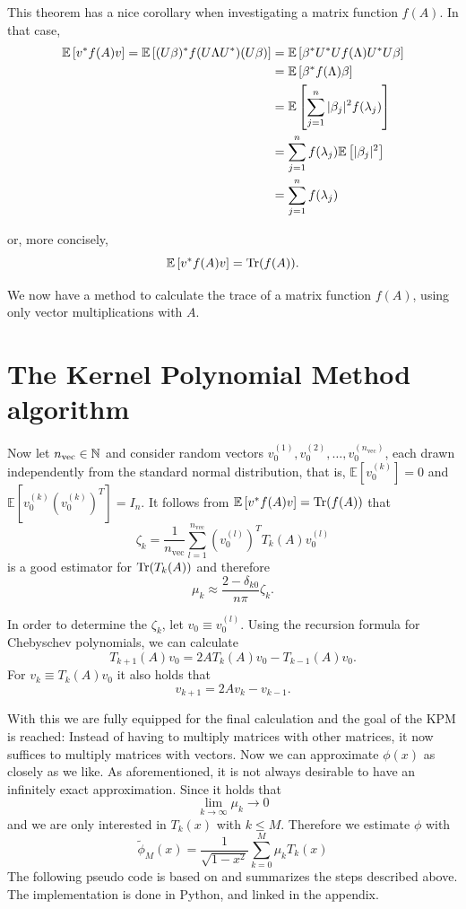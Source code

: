 This theorem has a nice corollary when investigating a matrix function $f(A)$.
In that case,
\begin{align*}
    \mathbb{E}\left[v^* f(A) v\right] = \mathbb{E}\left[(U\beta)^* f(U\Lambda U^*) (U\beta)\right] &= \mathbb{E}\left[\beta^* U^* U f(\Lambda) U^* U \beta\right] \\
    &= \mathbb{E}\left[\beta^* f(\Lambda) \beta\right] \\
    &= \mathbb{E}\left[\sum_{j = 1}^n |\beta_j|^2 f(\lambda_j) \right] \\
    &= \sum_{j = 1}^n f(\lambda_j) \mathbb{E}\left[ |\beta_j|^2 \right] \\
    &= \sum_{j = 1}^n f(\lambda_j)
\end{align*}

or, more concisely,
\[
    \mathbb{E}\left[v^* f(A) v\right] = \operatorname{Tr}(f(A)).
\]

We now have a method to calculate the trace of a matrix function $f(A)$,
using only vector multiplications with $A$.

\section{The Kernel Polynomial Method algorithm}

Now let $n_{\text{vec}} \in \mathbb{N}$ and consider random vectors $v_0^{(1)}, v_0^{(2)}, \dots, v_0^{(n_{\text{vec}})}$,
each drawn independently from the standard normal distribution, that is, $\mathbb{E}[v_0^{(k)}] = 0$ and $\mathbb{E}\left[v_0^{(k)} \left(v_0^{(k)}\right)^T\right] = I_n$.
It follows from $\mathbb{E}\left[v^* f(A) v\right] = \operatorname{Tr}(f(A))$ that
\[
\zeta_k = \frac{1}{n_{\text{vec}}} \sum_{l = 1}^{n_{\text{vec}}} \left( v_0^{(l)} \right)^T T_k(A) v_0^{(l)}
\]
is a good estimator for $\operatorname{Tr}(T_k(A))$ and therefore
\[
\mu_k \approx \frac{2 - \delta_{k0}}{n \pi} \zeta_k.
\]

In order to determine the $\zeta_k$, let $v_0 \equiv v_0^{(l)}$.
Using the recursion formula for Chebyschev polynomials, we can calculate
\[
T_{k + 1}(A)v_0 = 2 A T_k(A) v_0 - T_{k - 1}(A) v_0.
\]
For $v_k \equiv T_k(A)v_0$ it also holds that
\[
v_{k + 1} = 2 A v_k - v_{k - 1}.
\]

With this we are fully equipped for the final calculation and the goal of the KPM is reached:
Instead of having to multiply matrices with other matrices, it now suffices to multiply matrices with vectors.
Now we can approximate $\phi(x)$ as closely as we like.
As aforementioned, it is not always desirable to have an infinitely exact approximation.
Since it holds that
\[
\lim \limits_{k \to \infty} \mu_k \to 0
\]
and we are only interested in $T_k(x)$ with $k \leq M$.
Therefore we estimate $\phi$ with
\begin{equation} \label{Approximated spectral density}
    \tilde{\phi}_M(x) = \frac{1}{\sqrt{1 - x^2}} \sum_{k = 0}^{M} \mu_k T_k(x)
\end{equation}
The following pseudo code is based on \cite[p.~10]{linsaadyang14} and summarizes the steps described above.
The implementation is done in Python, and linked in the appendix.

